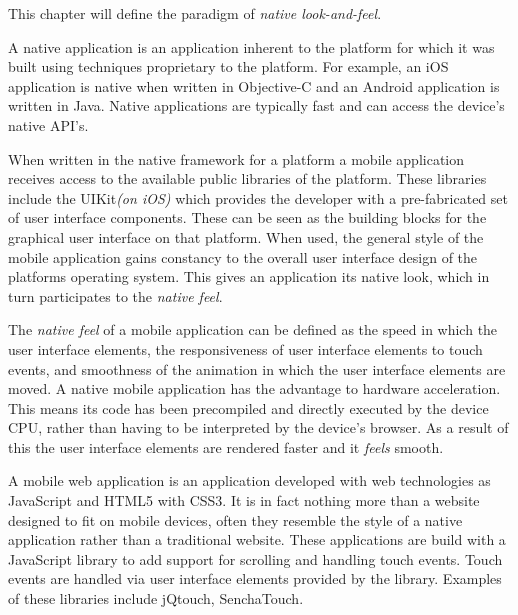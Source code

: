 This chapter will define the paradigm of \emph{native look-and-feel}.

A native application is an application inherent to the platform for which it was built using techniques proprietary to the platform. For example, an iOS application is native when written in Objective-C and an Android application is written in Java. Native applications are typically fast and can access the device's native API's.

When written in the native framework for a platform a mobile application receives access to the available public libraries of the platform. These libraries include the UIKit\emph{(on iOS)} which provides the developer with a pre-fabricated set of user interface components. These can be seen as the building blocks for the graphical user interface on that platform. When used, the general style of the mobile application gains constancy to the overall user interface design of the platforms operating system. This gives an application its native look, which in turn participates to the \emph{native feel}.


The \emph{native feel} of a mobile application can be defined as the speed in which the user interface elements, the responsiveness of user interface elements to touch events, and smoothness of the animation in which the user interface elements are moved. A native mobile application has the advantage to hardware acceleration. This means its code has been precompiled and directly executed by the device CPU, rather than having to be interpreted by the device's browser. As a result of this the user interface elements are rendered faster and it \emph{feels} smooth.
 	

A mobile web application is an application developed with web technologies as JavaScript and HTML5 with CSS3. It is in fact nothing more than a website designed to fit on mobile devices, often they resemble the style of a native application rather than a traditional website. These applications are build with a JavaScript library to add support for scrolling and handling touch events. Touch events are handled via user interface elements provided by the library. Examples of these libraries include jQtouch, SenchaTouch.

